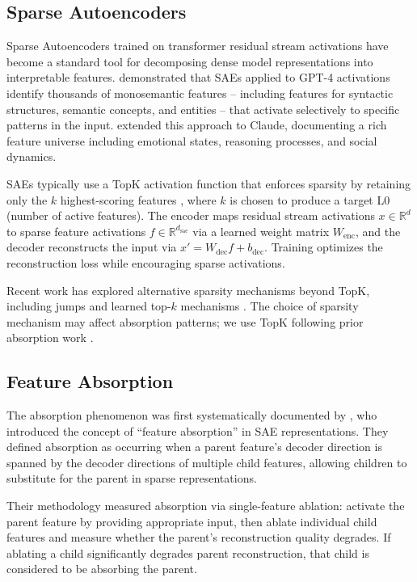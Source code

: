\documentclass{article}
\begin{document}
\subsection{Sparse Autoencoders}

Sparse Autoencoders trained on transformer residual stream activations have become a standard tool for decomposing dense model representations into interpretable features. \citet{bricken2023} demonstrated that SAEs applied to GPT-4 activations identify thousands of monosemantic features -- including features for syntactic structures, semantic concepts, and entities -- that activate selectively to specific patterns in the input. \citet{templeton2024} extended this approach to Claude, documenting a rich feature universe including emotional states, reasoning processes, and social dynamics.

SAEs typically use a TopK activation function that enforces sparsity by retaining only the $k$ highest-scoring features \citep{huber1962}, where $k$ is chosen to produce a target L0 (number of active features). The encoder maps residual stream activations $x \in \mathbb{R}^d$ to sparse feature activations $f \in \mathbb{R}^{d_{\text{sae}}}$ via a learned weight matrix $W_{\text{enc}}$, and the decoder reconstructs the input via $x' = W_{\text{dec}} f + b_{\text{dec}}$. Training optimizes the reconstruction loss while encouraging sparse activations.

Recent work has explored alternative sparsity mechanisms beyond TopK, including jumps \citep{sharkey2024} and learned top-$k$ mechanisms \citep{gao2025}. The choice of sparsity mechanism may affect absorption patterns; we use TopK following prior absorption work \citep{chanin2024}.

\subsection{Feature Absorption}

The absorption phenomenon was first systematically documented by \citet{chanin2024}, who introduced the concept of ``feature absorption'' in SAE representations. They defined absorption as occurring when a parent feature's decoder direction is spanned by the decoder directions of multiple child features, allowing children to substitute for the parent in sparse representations.

Their methodology measured absorption via single-feature ablation: activate the parent feature by providing appropriate input, then ablate individual child features and measure whether the parent's reconstruction quality degrades. If ablating a child significantly degrades parent reconstruction, that child is considered to be absorbing the parent.
\end{document}
